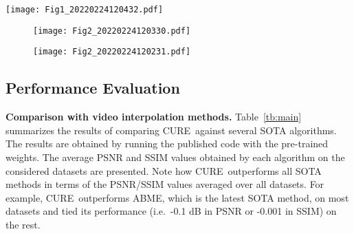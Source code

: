 \documentclass[12pt]{article}
\def\proposed{CURE}
\begin{document}
\begin{figure*}[t!]
  \centering
  \texttt{[image: Fig1\_20220224120432.pdf]}
  \caption{Visual comparison between \proposed~and current SOTA methods on an example from Vimeo90K. The visual differences are highlight by the yellow boxes paired with the residual error maps. Note how \proposed\ outperforms the SOTA methods in term of sharpness (see green arrows) and accuracy (yellow arrows).}
  \label{fig:vimeo90k}
\end{figure*}

\begin{figure*}[t!]
  \centering
  \begin{subfigure}[b]{\textwidth}
    \texttt{[image: Fig2\_20220224120330.pdf]}
    \end{subfigure}
  \begin{subfigure}[b]{\textwidth}
  \texttt{[image: Fig2\_20220224120231.pdf]}
  \end{subfigure}
  \caption{Visual comparison between \proposed~and current SOTA methods on two examples from SNU-FILM (hard). We highlight the differences by zooming in the regions with the presence of strong motion (the man's waist and the bird's wingtip). Note how \proposed~outperforms the SOTA methods by removing distortions and enhancing sharpness.}
  \label{fig:snu-film-hard}
\end{figure*}

\subsection{Performance Evaluation}

\textbf{Comparison with video interpolation methods.} Table~\ref{tb:main} summarizes the results of comparing \proposed~against several SOTA algorithms. The results are obtained by running the published code with the pre-trained weights. The average PSNR and SSIM values obtained by each algorithm on the considered datasets are presented.  Note how \proposed~outperforms all SOTA methods in terms of the PSNR/SSIM values averaged over all datasets.  For example, \proposed~outperforms ABME, which is the latest SOTA method, on most datasets and tied its performance (i.e.\ -0.1 dB in PSNR or -0.001 in SSIM) on the rest. 
\end{document}
